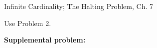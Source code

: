 \documentclass[handout]{mcs}
\begin{document}


\begin{staffnotes}
Infinite Cardinality; The Halting Problem, Ch. 7
\end{staffnotes}

\hint Use Problem 2.


\textbf{Supplemental problem:}


\end{document}

